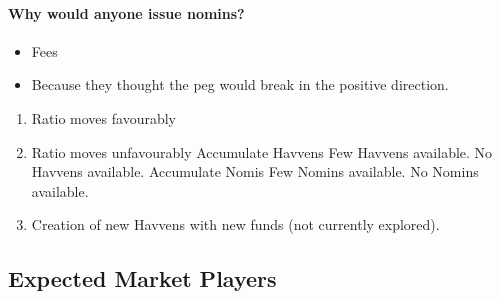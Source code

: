 \paragraph{Why would anyone issue nomins?}
\begin{itemize}
	\item Fees
	\item Because they thought the peg would break in the positive direction.
\end{itemize}

\begin{enumerate}
	\item Ratio moves favourably
	\item Ratio moves unfavourably
		\subitem Accumulate Havvens
			\subsubitem Few Havvens available.
			\subsubitem No Havvens available.
		\subitem Accumulate Nomis
			\subsubitem Few Nomins available.
			\subsubitem No Nomins available.
	\item Creation of new Havvens with new funds (not currently explored).
\end{enumerate}

\subsection{Expected Market Players}

